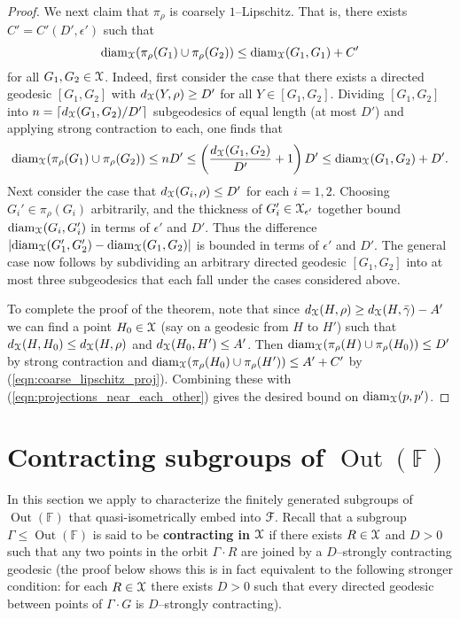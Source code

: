 \documentclass[letterpaper,fleqn]{article}
\theoremstyle{plain}
\theoremstyle{definition}
\newcommand{\define}[1]{\textbf{#1}}
\DeclareMathOperator{\diam}{diam}
\newcommand{\ceil}[1]{\left\lceil#1\right\rceil}
\newcommand{\abs}[1]{\left\vert#1\right\vert}
\DeclareMathOperator{\Out}{Out}
\newcommand{\free}{\mathbb{F}} %
\newcommand{\factor}{{\EuScript F}} %
\newcommand{\fc}{\factor} %
\newcommand{\os}{{\EuScript X}} %
\newcommand{\cp}{\pi} %
\renewcommand{\diam}{\mathrm{diam}}
\begin{document}
\begin{proof}
We next claim that $\cp_\rho$ is coarsely $1$--Lipschitz. That is, there exists $C'=C'(D',\epsilon')$ such that
\begin{equation}
\label{eqn:coarse_lipschitz_proj}
\diam_\os(\cp_\rho(G_1)\cup\cp_\rho(G_2)) \le \diam_\os(G_1,G_1) + C'
\end{equation}
for all $G_1,G_2\in\os$. Indeed, first consider the case that there exists a directed geodesic $[G_1,G_2]$ with $d_\os(Y,\rho) \ge D'$ for all $Y\in [G_1,G_2]$. Dividing $[G_1,G_2]$ into $n=\ceil{d_\os(G_1,G_2)/D'}$ subgeodesics of equal length (at most $D'$) and applying strong contraction to each, one finds that
\[\diam_\os(\cp_\rho(G_1)\cup\cp_\rho(G_2)) \le n D' \le \left(\frac{d_\os(G_1,G_2)}{D'} + 1\right) D' \le  \diam_\os(G_1,G_2)+D'.\]
Next consider the case that $d_\os(G_i,\rho)\le D'$ for each $i=1,2$. Choosing $G_i'\in\cp_\rho(G_i)$ arbitrarily,  and the thickness of $G'_i\in\os_{\epsilon'}$ together bound $\diam_\os(G_i,G'_i)$ in terms of $\epsilon'$ and $D'$. Thus the difference $\abs{\diam_\os(G'_1,G'_2) - \diam_\os(G_1,G_2)}$ is bounded in terms of $\epsilon'$ and $D'$. The general case now follows by subdividing an arbitrary directed geodesic $[G_1,G_2]$ into at most three subgeodesics that each fall under the cases considered above.

To complete the proof of the theorem, note that since $d_\os(H,\rho)\ge d_\os(H,\bar{\gamma})-A'$ we can find a point $H_0\in \os$ (say on a geodesic from $H$ to $H'$) such that $d_\os(H,H_0)\le d_\os(H,\rho)$ and $d_\os(H_0,H')\le A'$. Then $\diam_\os(\cp_\rho(H)\cup\cp_\rho(H_0))\le D'$ by strong contraction and $\diam_\os(\cp_\rho(H_0)\cup\cp_\rho(H')) \le A'+C'$ by (\ref{eqn:coarse_lipschitz_proj}). Combining these with (\ref{eqn:projections_near_each_other}) gives the desired bound on $\diam_\os(p,p')$.
\end{proof}

\section{Contracting subgroups of $\Out(\free)$}
\label{sec:contracting_subgroups}

In this section we apply  to characterize the finitely generated subgroups of $\Out(\free)$ that quasi-isometrically embed into $\fc$. Recall that a subgroup $\Gamma\le\Out(\free)$ is said to be \define{contracting in $\os$} if there exists $R\in\os$ and $D > 0$ such that any two points in the orbit $\Gamma\cdot R$ are joined by a $D$--strongly contracting geodesic (the proof below shows this is in fact equivalent to the following stronger condition: for each $R\in\os$ there exists $D > 0$ such that every directed geodesic between points of $\Gamma\cdot G$ is $D$--strongly contracting).
\end{document}
